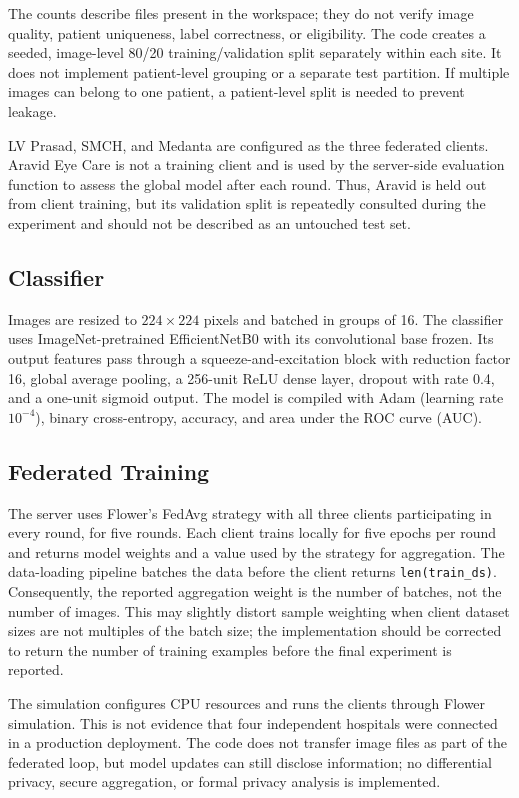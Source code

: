\documentclass[conference]{IEEEtran}
\begin{document}
The counts describe files present in the workspace; they do not verify image quality, patient uniqueness, label correctness, or eligibility. The code creates a seeded, image-level 80/20 training/validation split separately within each site. It does not implement patient-level grouping or a separate test partition. If multiple images can belong to one patient, a patient-level split is needed to prevent leakage.

LV Prasad, SMCH, and Medanta are configured as the three federated clients. Aravid Eye Care is not a training client and is used by the server-side evaluation function to assess the global model after each round. Thus, Aravid is held out from client training, but its validation split is repeatedly consulted during the experiment and should not be described as an untouched test set.

\subsection{Classifier}
Images are resized to $224 \times 224$ pixels and batched in groups of 16. The classifier uses ImageNet-pretrained EfficientNetB0 with its convolutional base frozen. Its output features pass through a squeeze-and-excitation block with reduction factor 16, global average pooling, a 256-unit ReLU dense layer, dropout with rate 0.4, and a one-unit sigmoid output. The model is compiled with Adam (learning rate $10^{-4}$), binary cross-entropy, accuracy, and area under the ROC curve (AUC).

\subsection{Federated Training}
The server uses Flower's FedAvg strategy with all three clients participating in every round, for five rounds. Each client trains locally for five epochs per round and returns model weights and a value used by the strategy for aggregation. The data-loading pipeline batches the data before the client returns \texttt{len(train\_ds)}. Consequently, the reported aggregation weight is the number of batches, not the number of images. This may slightly distort sample weighting when client dataset sizes are not multiples of the batch size; the implementation should be corrected to return the number of training examples before the final experiment is reported.

The simulation configures CPU resources and runs the clients through Flower simulation. This is not evidence that four independent hospitals were connected in a production deployment. The code does not transfer image files as part of the federated loop, but model updates can still disclose information; no differential privacy, secure aggregation, or formal privacy analysis is implemented.
\end{document}
